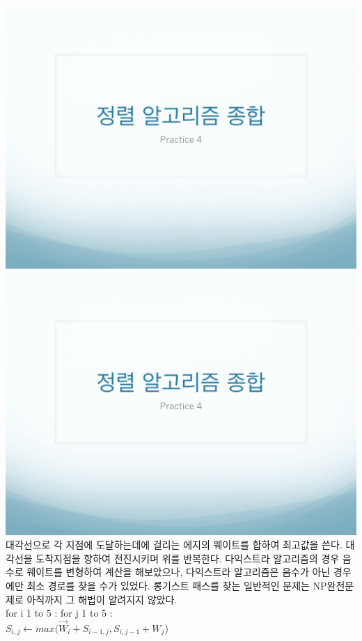 \documentclass[12pt,a4paper]{article}
\begin{document}
\includegraphics[page=8, width=\textwidth]{11.pdf}
\includegraphics[page=9, width=\textwidth]{11.pdf}
대각선으로 각 지점에 도달하는데에 걸리는 에지의 웨이트를 합하여 최고값을 쓴다.
대각선을 도착지점을 향하여 전진시키며 위를 반복한다.
다익스트라 알고리즘의 경우 음수로 웨이트를 변형하여 계산을 해보았으나, 다익스트라 알고리즘은 음수가 아닌 경우에만 최소 경로를 찾을 수가 있었다.
롱기스트 패스를 찾는 일반적인 문제는 NP완전문제로 아직까지 그 해법이 알려지지 않았다.\\

for i 1 to 5 : for j 1 to 5 :\\
$S_{i,j} \leftarrow max(\overrightarrow{W}_{i}+S_{i-1,j}, 
S_{i,j-1}+W_j$\textdownarrow)
\end{document}
